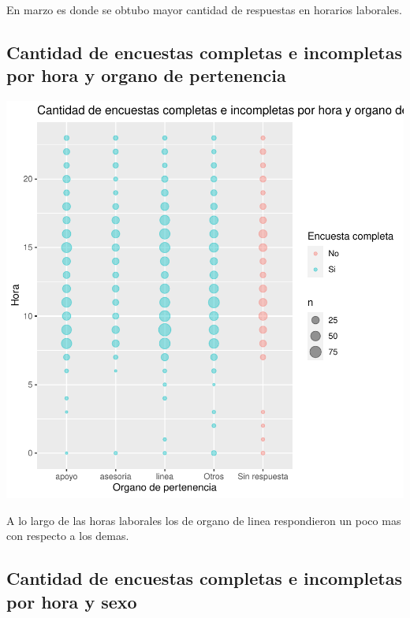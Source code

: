 \documentclass{article}
\begin{document}
En marzo es donde se obtubo mayor cantidad de respuestas en horarios laborales.

\subsection{Cantidad de encuestas completas e incompletas por hora y organo de pertenencia}

\includegraphics{seguimientov3-011}

A lo largo de las horas laborales los de organo de linea respondieron un poco mas con respecto a los demas.

\subsection{Cantidad de encuestas completas e incompletas por hora y sexo}
\end{document}
